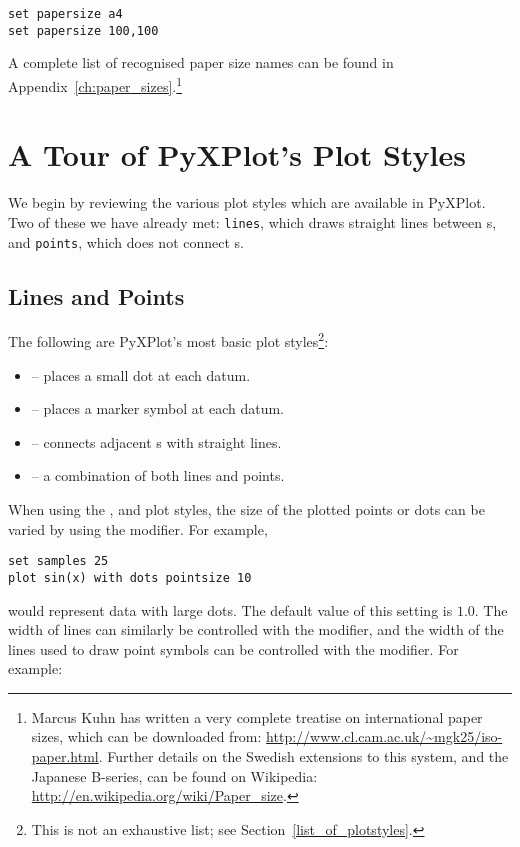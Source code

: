 \begin{verbatim}
set papersize a4
set papersize 100,100
\end{verbatim}

\noindent A complete list of recognised paper size names can be found in
Appendix~\ref{ch:paper_sizes}.\footnote{Marcus Kuhn has written a very complete
treatise on international paper sizes, which can be downloaded from:
\url{http://www.cl.cam.ac.uk/~mgk25/iso-paper.html}. Further details on the
Swedish extensions to this system, and the Japanese B-series, can be found on
Wikipedia: \url{http://en.wikipedia.org/wiki/Paper_size}.}

\section{A Tour of PyXPlot's Plot Styles}

We begin by reviewing the various plot styles which are available in PyXPlot.
Two of these we have already met: {\tt lines}, which draws straight lines
between \datapoint s, and {\tt points}, which does not connect \datapoint s.

\subsection{Lines and Points}

The following are PyXPlot's most basic plot styles\footnote{This is not an
exhaustive list; see Section~\ref{list_of_plotstyles}.}:
\begin{itemize}
\item {} -- places a small dot at each datum.
\item {} -- places a marker symbol at each datum.
\item {} -- connects adjacent \datapoint s with straight lines.
\item {} -- a combination of both lines and points.
\end{itemize}

When using the ,  and  plot
styles, the size of the plotted points or dots can be varied by using the
 modifier. For example,

\begin{verbatim}
set samples 25
plot sin(x) with dots pointsize 10
\end{verbatim}

\noindent would represent data with large dots. The default value of this
setting is $1.0$. The width of lines can similarly be controlled with the
 modifier, and the width of the lines used to draw point
symbols can be controlled with the  modifier. For
example:


